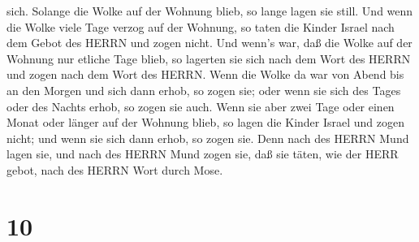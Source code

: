 sich. Solange die Wolke auf der Wohnung blieb, so lange lagen sie still.
 Und wenn die Wolke viele Tage verzog auf der Wohnung, so
taten die Kinder Israel nach dem Gebot des HERRN und zogen nicht.
 Und wenn's war, daß die Wolke auf der Wohnung nur etliche
Tage blieb, so lagerten sie sich nach dem Wort des HERRN und zogen nach
dem Wort des HERRN.  Wenn die Wolke da war von Abend bis an
den Morgen und sich dann erhob, so zogen sie; oder wenn sie sich des
Tages oder des Nachts erhob, so zogen sie auch.  Wenn sie
aber zwei Tage oder einen Monat oder länger auf der Wohnung blieb, so
lagen die Kinder Israel und zogen nicht; und wenn sie sich dann erhob,
so zogen sie.  Denn nach des HERRN Mund lagen sie, und nach
des HERRN Mund zogen sie, daß sie täten, wie der HERR gebot, nach des
HERRN Wort durch Mose.

\hypertarget{section-9}{%
\section{10}\label{section-9}}

